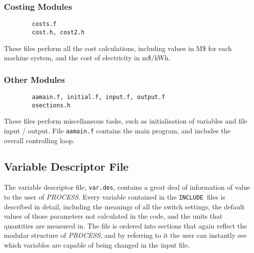 \documentclass[11pt,a4paper]{report}
\makeatletter
\newcommand{\PSD}{\mbox{\it PROCESS}\@.\/ }
\newcommand{\PSC}{\mbox{\it PROCESS},\/ }
\newcommand{\INCLUDE}{\mbox{\tt INCLUDE }}
\makeatother
\begin{document}
\subsubsection{Costing Modules}
\begin{verbatim}
        costs.f
        cost.h, cost2.h
\end{verbatim}
These files perform all the cost calculations, including values in M\$ for
each machine system, and the cost of electricity in m\$/kWh.

\subsubsection{Other Modules}
\begin{verbatim}
        aamain.f, initial.f, input.f, output.f
        osections.h
\end{verbatim}
These files perform miscellaneous tasks, such as initialisation of variables
and file input / output. File {\tt aamain.f} contains the main program, and
includes the overall controlling loop.

\subsection{Variable Descriptor File}

The variable descriptor file, {\tt var.des}, contains a great deal of
information of value to the user of \PSD Every variable contained in the
\INCLUDE files is described in detail, including the meanings of all the
switch settings, the default values of those parameters not calculated in the
code, and the units that quantities are measured in. The file is ordered into
sections that again reflect the modular structure of \PSC and by referring to
it the user can instantly see which variables are capable of being changed in
the input file.

\end{document}
